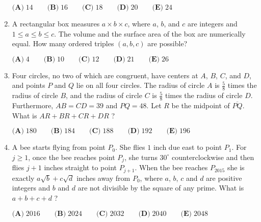 \documentclass{article}
\begin{document}
\begin{enumerate}[label=\arabic*., itemsep=0.5em]
\(\textbf{(A)}\; 14 \qquad\textbf{(B)}\; 16 \qquad\textbf{(C)}\; 18 \qquad\textbf{(D)}\; 20 \qquad\textbf{(E)}\; 24\)\par \vspace{0.5em}\item A rectangular box measures \(a \times b \times c\), where \(a\), \(b\), and \(c\) are integers and \(1\leq a \leq b \leq c\). The volume and the surface area of the box are numerically equal. How many ordered triples \((a,b,c)\) are possible?

\(\textbf{(A)}\; 4 \qquad\textbf{(B)}\; 10 \qquad\textbf{(C)}\; 12 \qquad\textbf{(D)}\; 21 \qquad\textbf{(E)}\; 26\)\par \vspace{0.5em}\item Four circles, no two of which are congruent, have centers at \(A\), \(B\), \(C\), and \(D\), and points \(P\) and \(Q\) lie on all four circles. The radius of circle \(A\) is \(\tfrac{5}{8}\) times the radius of circle \(B\), and the radius of circle \(C\) is \(\tfrac{5}{8}\) times the radius of circle \(D\). Furthermore, \(AB = CD = 39\) and \(PQ = 48\). Let \(R\) be the midpoint of \(\overline{PQ}\). What is \(AR+BR+CR+DR\) ?

\(\textbf{(A)}\; 180 \qquad\textbf{(B)}\; 184 \qquad\textbf{(C)}\; 188 \qquad\textbf{(D)}\; 192\qquad\textbf{(E)}\; 196\)\par \vspace{0.5em}\item A bee starts flying from point \(P_0\). She flies \(1\) inch due east to point \(P_1\). For \(j \ge 1\), once the bee reaches point \(P_j\), she turns \(30^{\circ}\) counterclockwise and then flies \(j+1\) inches straight to point \(P_{j+1}\). When the bee reaches \(P_{2015}\) she is exactly \(a \sqrt{b} + c \sqrt{d}\) inches away from \(P_0\), where \(a\), \(b\), \(c\) and \(d\) are positive integers and \(b\) and \(d\) are not divisible by the square of any prime. What is \(a+b+c+d\) ?

\(\textbf{(A)}\; 2016 \qquad\textbf{(B)}\; 2024 \qquad\textbf{(C)}\; 2032 \qquad\textbf{(D)}\; 2040 \qquad\textbf{(E)}\; 2048\)\par \vspace{0.5em}\end{enumerate}
\end{document}
